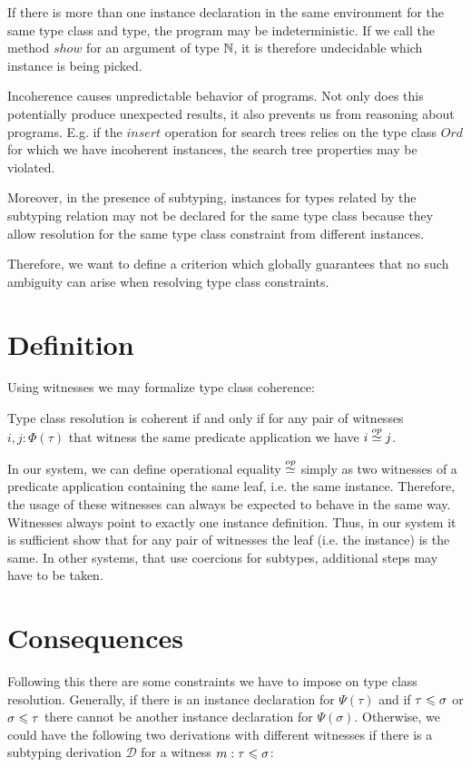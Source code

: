 If there is more than one instance declaration in the same environment for the same type class and type,
the program may be indeterministic.
If we call the method $\mathit{show}$ for an argument of type $\mathbb{N}$,
it is therefore undecidable which instance is being picked.

Incoherence causes unpredictable behavior of programs.
Not only does this potentially produce unexpected results, it also prevents us from reasoning about programs.
E.g. if the $\mathit{insert}$ operation for search trees relies on the type class $\mathit{Ord}$ for which we have incoherent instances,
the search tree properties may be violated. \cite{Kilpatrick2019-cy}

Moreover, in the presence of subtyping, instances for types related by the subtyping relation may not be declared for the same type class because they allow resolution for the same type class constraint from different instances.

Therefore, we want to define a criterion which globally guarantees that no such ambiguity can arise when resolving type class constraints.


\section{Definition}

Using witnesses we may formalize type class coherence:

\begin{definition}
  Type class resolution is coherent if and only if for any pair of witnesses $i,j : \Phi(\tau)$ that witness the same predicate application we have $i \stackrel{op}{\simeq} j$.
\end{definition}

In our  system, we can define operational equality $\stackrel{op}{\simeq}$ simply as two witnesses of a predicate application containing the same leaf, i.e. the same instance.
Therefore, the usage of these witnesses can always be expected to behave in the same way.
Witnesses always point to exactly one instance definition.
Thus, in our system it is sufficient show that for any pair of witnesses the leaf (i.e. the instance) is the same.
In other systems, that use coercions for subtypes, additional steps may have to be taken.

\section{Consequences}

Following this there are some constraints we have to impose on type class resolution.
Generally, if there is an instance declaration for $\Psi(\tau)$ and if $\tau \leqslant \sigma$ or $\sigma \leqslant \tau$ there cannot be another instance declaration for $\Psi(\sigma)$.
Otherwise, we could have the following two derivations with different witnesses if there is a subtyping derivation $\mathscr{D}$ for a witness $m : \tau \leqslant \sigma$:

